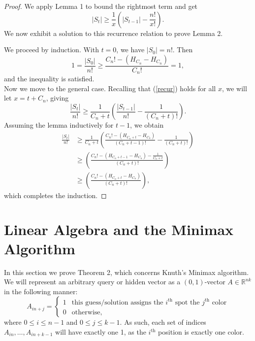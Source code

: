 \documentclass[12pt, a4paper]{article}
\newcommand{\R}{\mathbb{R}}           %
\begin{document}
\begin{proof}[Proof]
		We apply Lemma 1 to bound the rightmost term and get 
		\begin{equation}\label{recur}
			|S_t| \ge \frac{1}{x}\left(|S_{t-1}|-\frac{n!}{x!}\right).
		\end{equation}
		We now exhibit a solution to this recurrence relation to prove Lemma 2.
		
		We proceed by induction. With $t=0$, we have $|S_0| = n!$. Then
			\begin{equation*}
			1 =\frac{|S_0|}{n!}\ge \frac{C_{n}! - (H_{C_{n}}-H_{C_{n}})}{C_{n}!} = 1,
			\end{equation*}
			and the inequality is satisfied. \\
			Now we move to the general case.
			Recalling that (\ref{recur}) holds for all $x$, we will
		let $x=t+C_{n}$, giving
			\begin{equation*}
			\frac{|S_t|}{n!}
			 \ge \frac{1}{C_{n}+t}\left(\frac{|S_{t-1}|}{n!}
			-\frac{1}{(C_{n}+t)!}\right).
			\end{equation*}
		Assuming the lemma inductively for $t-1$, we obtain
			\begin{align*}
			\frac{|S_t|}{n!}
			& \ge \frac{1}{C_{n}+t}\left(\frac{C_{n}!-(H_{C_{n}+t} - H_{C_{n}})}
			{(C_{n}+t-1)!} - \frac{1}{(C_{n}+t)!}\right)\\
			& \ge \left(\frac{C_{n}! - (H_{C_{n}+t-1} - H_{C_{n}}) - \frac{1}{C_{n}+t}}
			{(C_{n}+t)!}\right)\\
			& \ge \left(\frac{C_{n}! - (H_{C_{n}+t} - H_{C_{n}})}{(C_{n}+t)!}\right),
			\end{align*}
			which completes the induction.
		\end{proof}
\section{Linear Algebra and the Minimax Algorithm}
In this section we prove Theorem 2, which concerns Knuth's Minimax algorithm. 
We will represent an arbitrary query or hidden vector as a $(0,1)$-vector $A \in \R^{nk}$ in the following manner: 
$$
A_{in+j} = \begin{cases}
1 & \text{this guess/solution assigns the $i^\text{th}$ spot the $j^\text{th}$ color} \\
0 & \text{otherwise},
\end{cases}
$$
where $0 \leq i \leq n-1$ and $0 \leq j \leq k-1$. As such, each set of indices $A_{in},\dots,A_{in+k-1}$ will have exactly one 1, as the $i^\text{th}$ position is exactly one color.
\end{document}
